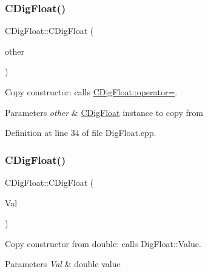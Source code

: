 \mbox{\label{classCDigFloat_a980c2c8c16275a8f838f2f7dc9b3670b}} 
\subsubsection{\texorpdfstring{C\+Dig\+Float()}{CDigFloat()}\hspace{0.1cm}{\footnotesize\ttfamily [2/3]}}
{\footnotesize\ttfamily C\+Dig\+Float\+::\+C\+Dig\+Float (\begin{DoxyParamCaption}\item[{const \hyperlink{classCDigFloat}{C\+Dig\+Float} \&}]{other }\end{DoxyParamCaption})}



Copy constructor\+: calls \hyperlink{classCDigFloat_a74f36566c2c79d7258b7b2dee35d46b2}{C\+Dig\+Float\+::operator=}. 


\begin{DoxyParams}{Parameters}
{\em other} & \hyperlink{classCDigFloat}{C\+Dig\+Float} instance to copy from \\
\hline
\end{DoxyParams}


Definition at line 34 of file Dig\+Float.\+cpp.

\mbox{\label{classCDigFloat_a0ae24452dfb7838ec97a3998cd2b8f36}} 
\subsubsection{\texorpdfstring{C\+Dig\+Float()}{CDigFloat()}\hspace{0.1cm}{\footnotesize\ttfamily [3/3]}}
{\footnotesize\ttfamily C\+Dig\+Float\+::\+C\+Dig\+Float (\begin{DoxyParamCaption}\item[{const double}]{Val }\end{DoxyParamCaption})}



Copy constructor from double\+: calls Dig\+Float\+::\+Value. 


\begin{DoxyParams}{Parameters}
{\em Val} & double value \\
\hline
\end{DoxyParams}


